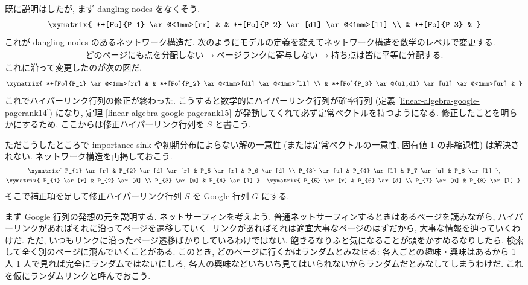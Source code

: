 \documentclass[openany, a4paper, oneside]{jsbook}
\begin{document}
既に説明はしたが, まず dangling nodes をなくそう.
\begin{gather}
 \xymatrix{
  *+[Fo]{P_1} \ar@<1mm>[rr] & & *+[Fo]{P_2} \ar[dl] \ar@<1mm>[ll] \\
  & *+[Fo]{P_3} &
 }
\end{gather}
これが dangling nodes のあるネットワーク構造だ.
次のようにモデルの定義を変えてネットワーク構造を数学のレベルで変更する.
\begin{align}
 \text{どのページにも点を分配しない}
 \to \text{ページランクに寄与しない}
 \to \text{持ち点は皆に平等に分配する}.
\end{align}
これに沿って変更したのが次の図だ.
\begin{gather}
 \xymatrix{
   *+[Fo]{P_1} \ar@<1mm>[rr] & & *+[Fo]{P_2} \ar@<1mm>[dl] \ar@<1mm>[ll] \\
   & *+[Fo]{P_3} \ar@(ul,dl) \ar[ul] \ar@<1mm>[ur] &
 }
\end{gather}
これでハイパーリンク行列の修正が終わった.
こうすると数学的にハイパーリンク行列が確率行列 (定義 \ref{linear-algebra-google-pagerank14}) になり,
定理 \ref{linear-algebra-google-pagerank15} が発動してくれて必ず定常ベクトルを持つようになる.
修正したことを明らかにするため, ここからは修正ハイパーリンク行列を $S$ と書こう.

ただこうしたところで importance sink や初期分布によらない解の一意性 (または定常ベクトルの一意性,
固有値 1 の非縮退性) は解決されない.
ネットワーク構造を再掲しておこう.
\begin{gather}
 \xymatrix{
  P_{1} \ar[r] & P_{2} \ar[d] \ar[r] & P_5 \ar[r] & P_6 \ar[d] \\
  P_{3} \ar[u] & P_{4} \ar[l]        & P_7 \ar[u] & P_8 \ar[l]
 }, \\
 \xymatrix{
  P_{1} \ar[r] & P_{2} \ar[d] \\
  P_{3} \ar[u] & P_{4} \ar[l]
 }
 \quad
 \xymatrix{
  P_{5} \ar[r] & P_{6} \ar[d] \\
  P_{7} \ar[u] & P_{8} \ar[l]
 }.
\end{gather}
そこで補正項を足して修正ハイパーリンク行列 $S$ を Google 行列 $G$ にする.

まず Google 行列の発想の元を説明する.
ネットサーフィンを考えよう.
普通ネットサーフィンするときはあるページを読みながら,
ハイパーリンクがあればそれに沿ってページを遷移していく.
リンクがあればそれは適宜大事なページのはずだから, 大事な情報を辿っていくわけだ.
ただ, いつもリンクに沿ったページ遷移ばかりしているわけではない.
飽きるなりふと気になることが頭をかすめるなりしたら, 検索して全く別のページに飛んでいくことがある.
このとき, どのページに行くかはランダムとみなせる:
各人ごとの趣味・興味はあるから 1 人 1 人で見れば完全にランダムではないにしろ,
各人の興味などいちいち見てはいられないからランダムだとみなしてしまうわけだ.
これを仮にランダムリンクと呼んでおこう.
\end{document}
